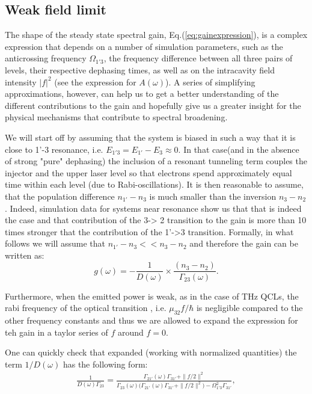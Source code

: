 \documentclass[10pt,english,fleqn]{article}%
\begin{document}
\subsection{Weak field limit}

The shape of the steady state spectral gain, Eq.(\ref{eq:gainexpression}), is a complex expression that depends on a number of simulation parameters, such as the 
anticrossing frequency $\Omega_{1'3}$, the frequency difference between all three pairs of levels, their respective dephasing times, 
as well as on the intracavity field intensity $|f|^2$ (see the expression for $A(\omega)$).
A series of simplifying approximations, however, can help us to get a better understanding of the different contributions 
to the gain and hopefully give us a greater insight for the physical mechanisms that contribute to spectral broadening. 

We will start off by assuming that the 
system is biased in such a way that it is close to 1'-3 resonance, i.e. $E_{1'3} = E_{1'} - E_{3} \approx 0$. In that case(and in the absence of strong "pure" 
dephasing) the inclusion of a resonant tunneling term couples the injector and the upper laser level so that electrons spend approximately equal time
within each level (due to Rabi-oscillations). It is then reasonable to assume, that the population difference $n_{1'}-n_3$ is much smaller than the inversion $n_3 - n_2$. Indeed, simulation
data for systems near resonance show us that that is indeed the case and that contribution of the 3-> 2 transition to the gain is more than 10 times stronger that the contribution 
of the 1'->3 transition. Formally, in what follows we will assume that $n_{1'}-n_3 << n_3-n_2 $ and therefore the gain can be written as:
\begin{equation}
 g(\omega) =  -\frac{1}{D(\omega)} \times \frac{ (n_3-n_2)}{\Gamma_{23}(\omega)} . \label{eq:gainexpression}
\end{equation}

Furthermore, when the emitted power is weak, as in the case of THz QCLs, the rabi frequency of the optical transition , i.e. $\mu_{32}f/\hbar$ is negligible compared
to the other frequency constants and thus we are allowed to expand the expression for teh gain in a taylor series of $f$ around $f = 0$.

One can quickly check that expanded (working with normalized quantities) the term $1/D(\omega)$ has the following form:
\begin{align}
 \frac{1}{D(\omega)\Gamma_{23}} = \frac{   \Gamma_{21'}(\omega)\Gamma_{31'} +\|f/2\|^2 }{
 \Gamma_{23}(\omega) \big(  \Gamma_{21'}(\omega)\Gamma_{31'} +\|f/2\|^2 \big) - \Omega_{1'3}^2\Gamma_{31'}}, 
\end{align}
\end{document}
